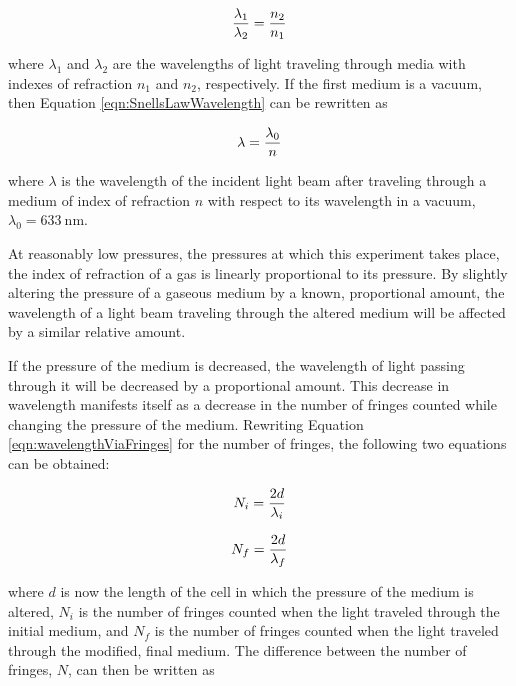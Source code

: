 \documentclass[12pt]{article}
\begin{document}
\begin{equation}
  \label{eqn:SnellsLawWavelength}
  \frac{\lambda_1}{\lambda_2} = \frac{n_2}{n_1} \\
\end{equation}

where \(\lambda_1\) and \(\lambda_2\) are the wavelengths of light traveling
through media with indexes of refraction \(n_1\) and \(n_2\), respectively. If
the first medium is a vacuum, then Equation \ref{eqn:SnellsLawWavelength} can be
rewritten as

\begin{equation}
  \label{eqn:SnellsLawVacuum}
  \lambda = \frac{\lambda_0}{n} \\
\end{equation}

where \(\lambda\) is the wavelength of the incident light beam after traveling
through a medium of index of refraction \(n\) with respect to its wavelength in
a vacuum, \(\lambda_0 = \SI{633}{\nano\meter}\). 

\qq At reasonably low pressures, the pressures at which this experiment takes
place, the index of refraction of a gas is linearly proportional to its
pressure. By slightly altering the pressure of a gaseous medium by a known,
proportional amount, the wavelength of a light beam traveling through the
altered medium will be affected by a similar relative amount.

\qq If the pressure of the medium is decreased, the wavelength of light passing
through it will be decreased by a proportional amount. This decrease in
wavelength manifests itself as a decrease in the number of fringes counted while
changing the pressure of the medium. Rewriting Equation
\ref{eqn:wavelengthViaFringes} for the number of fringes, the following two
equations can be obtained:

\begin{equation}
  \label{eqn:initialFringes}
  N_i = \frac{2d}{\lambda_i} \\
\end{equation}

\begin{equation}
  \label{eqn:finalFringes}
  N_f = \frac{2d}{\lambda_f} \\
\end{equation}

where \(d\) is now the length of the cell in which the pressure of the medium is
altered, \(N_i\) is the number of fringes counted when the light traveled through
the initial medium, and \(N_f\) is the number of fringes counted when the light
traveled through the modified, final medium. The difference between the number
of fringes, \(N\), can then be written as
\end{document}
